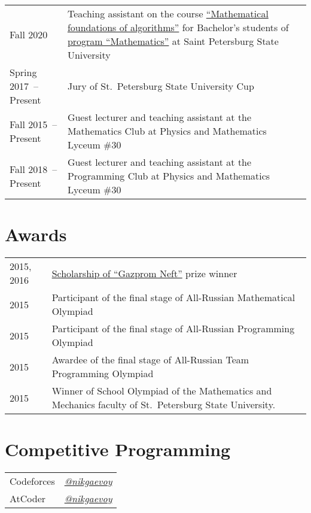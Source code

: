 \documentclass[a4paper, 11pt]{article}
\begin{document}
\begin{tabularx}{\textwidth}{lX}
	Fall 2020 & Teaching assistant on the course \href{https://users.math-cs.spbu.ru/~okhotin/teaching/algorithms_2020/}{``Mathematical foundations of algorithms''} for Bachelor's students of \href{https://math-cs.spbu.ru/en/}{program ``Mathematics''} at Saint Petersburg State University \\

	Spring 2017~-- Present & Jury of St.~Petersburg State University Cup \\

	Fall 2015~-- Present & Guest lecturer and teaching assistant at the Mathematics Club at Physics and Mathematics Lyceum \#30 \\

	Fall 2018~-- Present & Guest lecturer and teaching assistant at the Programming Club at Physics and Mathematics Lyceum \#30
\end{tabularx}

\section*{Awards}

\begin{tabularx}{\textwidth}{lX}
	2015, 2016 & \href{https://math-cs.spbu.ru/en/scholarships-rodnye-goroda/}{Scholarship of ``Gazprom Neft''} prize winner \\

	2015 & Participant of the final stage of All-Russian Mathematical Olympiad \\

	2015 & Participant of the final stage of All-Russian Programming Olympiad \\

	2015 & Awardee of the final stage of All-Russian Team Programming Olympiad \\

	2015 & Winner of School Olympiad of the Mathematics and Mechanics faculty of St.~Petersburg State University.
\end{tabularx}

\section*{Competitive Programming}

\begin{tabular}{ll}
	Codeforces & \href{https://codeforces.com/profile/nikgaevoy}{{\it @nikgaevoy}} \\
	AtCoder & \href{https://atcoder.jp/users/nikgaevoy}{{\it @nikgaevoy}}
\end{tabular}
\end{document}
